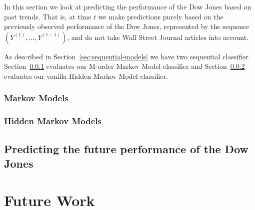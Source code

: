 \documentclass[10pt, twocolumn]{article}
\begin{document}
\begin{itemize}
In this section we look at predicting the performance of the Dow Jones based on past trends.
That is, at time $t$ we make predictions purely based on the previously observed performance of the Dow Jones, represented by the sequence $(Y^{(1)}, ..., Y^{(t-1)})$, and do not take Wall Street Journal articles into account.

As described in Section~\ref{sec:sequential-models} we have two sequential classifier.
Section~\ref{mm-eval} evaluates our M-order Markov Model classifier and Section~\ref{hmm-eval} evaluates our vanilla Hidden Markov Model classifier.

\subsubsection{Markov Models}
\label{mm-eval}

\subsubsection{Hidden Markov Models}
\label{hmm-eval}

\subsection{Predicting the future performance of the Dow Jones}
\label{predict-dj}

\end{itemize}

\section{Future Work}



\end{document}
